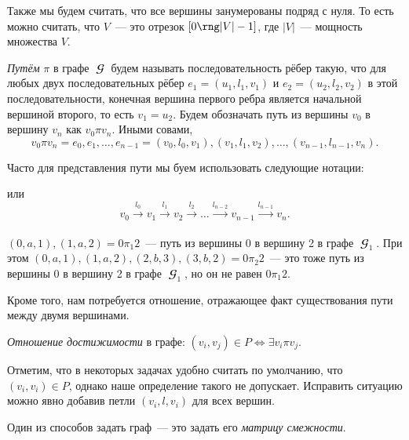 Также мы будем считать, что все вершины занумерованы подряд с нуля.
То есть можно считать, что $V$~--- это отрезок $[0 \rng |V| - 1]$, где $|V|$~--- мощность множества $V$.

\begin{definition}[Путь]
    \emph{Путём} $\pi$ в графе $\mbfscrG$ будем называть последовательность рёбер такую, что для любых двух последовательных рёбер $e_1 = (u_1, l_1, v_1)$ и $e_2 = (u_2, l_2, v_2)$ в этой последовательности, конечная вершина первого ребра является начальной вершиной второго, то есть $v_1 = u_2$.
    Будем обозначать путь из вершины $v_0$ в вершину $v_n$ как $v_0 \pi v_n$.
    Иными совами,
    \[v_0 \pi v_n = e_0,e_1, \dots, e_{n-1} = (v_0, l_0, v_1),(v_1,l_1,v_2),\dots,(v_{n-1},l_{n-1},v_n).\]
\end{definition}
Часто для представления пути мы буем использовать следующие нотации:
\begin{center}
    
\end{center}
или
\[
    v_0 \xrightarrow[]{l_0} v_1 \xrightarrow[]{l_1} v_2 \xrightarrow[]{l_2} \ldots \xrightarrow[]{l_{n-2}} v_{n-1} \xrightarrow[]{l_{n-1}} v_n.
\]

\begin{example}
    $(0,a,1), (1,a,2) = 0 \pi_1 2$~--- путь из вершины 0 в вершину 2 в графе $\mbfscrG_1$.
    При этом $(0, a, 1), (1, a, 2), (2, b, 3), (3, b, 2) = 0 \pi_2 2$~--- это тоже путь из вершины 0 в вершину 2 в графе $\mbfscrG_1$, но он не равен $0 \pi_1 2$.
\end{example}

Кроме того, нам потребуется отношение, отражающее факт существования пути между двумя вершинами.

\begin{definition}
    \label{def:reach}
    \emph{Отношение достижимости} в графе: $(v_i,v_j) \in P \iff \exists v_i \pi v_j$.
\end{definition}

Отметим, что в некоторых задачах удобно считать по умолчанию, что $(v_i,v_i) \in P$, однако наше определение такого не допускает.
Исправить ситуацию можно явно добавив петли $(v_i,l,v_i)$ для всех вершин.

Один из способов задать граф~--- это задать его \emph{матрицу смежности}.

